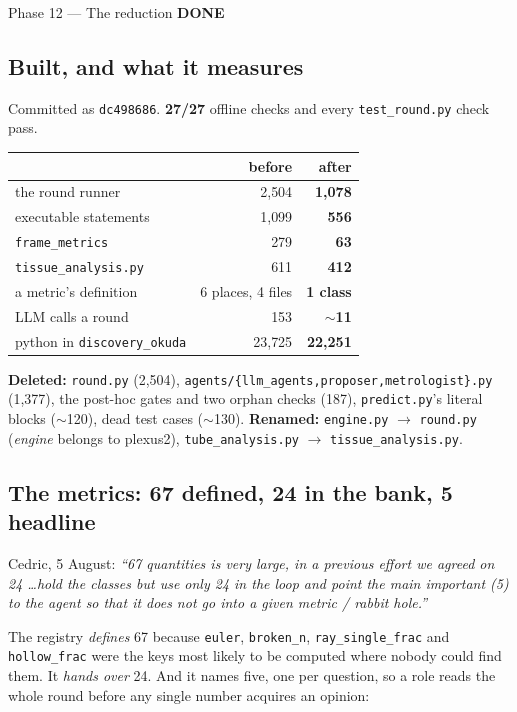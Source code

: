 \documentclass[11pt,a4paper]{article}
\newcommand{\code}[1]{\texttt{#1}}
\newcommand{\done}{\textcolor{good}{\textbf{DONE}}}
\begin{document}
\begin{phasebox}{Phase 12 --- The reduction \hfill \done}
\subsection*{Built, and what it measures}
Committed as \code{dc498686}. \textbf{27/27} offline checks and every \code{test\_round.py} check pass.

\begin{center}\small
\begin{tabular}{lrr}
\toprule
 & before & after \\
\midrule
the round runner                 & 2{,}504 & \textbf{1{,}078} \\
\quad executable statements      & 1{,}099 & \textbf{556} \\
\code{frame\_metrics}            &   279 & \textbf{63} \\
\code{tissue\_analysis.py}       &   611 & \textbf{412} \\
a metric's definition            & 6 places, 4 files & \textbf{1 class} \\
LLM calls a round                &   153 & $\sim$\textbf{11} \\
python in \code{discovery\_okuda}& 23{,}725 & \textbf{22{,}251} \\
\bottomrule
\end{tabular}
\end{center}

\noindent \textbf{Deleted:} \code{round.py} (2{,}504), \code{agents/\{llm\_agents,proposer,metrologist\}.py}
(1{,}377), the post-hoc gates and two orphan checks (187), \code{predict.py}'s literal blocks
($\sim$120), dead test cases ($\sim$130). \textbf{Renamed:} \code{engine.py} $\to$ \code{round.py}
(\emph{engine} belongs to plexus2), \code{tube\_analysis.py} $\to$ \code{tissue\_analysis.py}.

\subsection*{The metrics: 67 defined, 24 in the bank, 5 headline}
Cedric, 5 August: \emph{``67 quantities is very large, in a previous effort we agreed on 24 \dots hold
the classes but use only 24 in the loop and point the main important (5) to the agent so that it does
not go into a given metric / rabbit hole.''}

The registry \emph{defines} 67 because \code{euler}, \code{broken\_n}, \code{ray\_single\_frac} and
\code{hollow\_frac} were the keys most likely to be computed where nobody could find them. It
\emph{hands over} 24. And it names five, one per question, so a role reads the whole round before any
single number acquires an opinion:


\end{phasebox}
\end{document}

